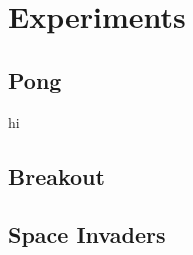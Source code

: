 \chapter{Experiments}

\section{Pong}
hi \cite{davidsilver-course}
\section{Breakout}

\section{Space Invaders}
